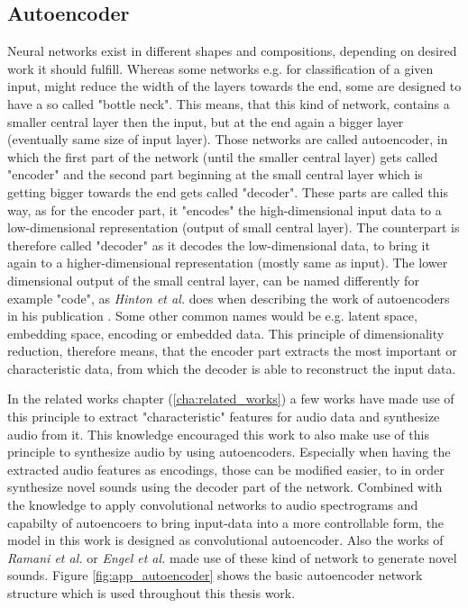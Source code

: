 \subsection{Autoencoder}
Neural networks exist in different shapes and compositions, depending on desired work it should fulfill. Whereas some networks e.g. for classification of a given input, might reduce the width of the layers towards the end, some are designed to have a so called "bottle neck". This means, that this kind of network, contains a smaller central layer then the input, but at the end again a bigger layer (eventually same size of input layer). \cite{hinton2006autoencoder} Those networks are called autoencoder, in which the first part of the network (until the smaller central layer) gets called "encoder" and the second part beginning at the small central layer which is getting bigger towards the end gets called "decoder". These parts are called this way, as for the encoder part, it "encodes" the high-dimensional input data to a low-dimensional representation (output of small central layer). The counterpart is therefore called "decoder" as it decodes the low-dimensional data, to bring it again to a higher-dimensional representation (mostly same as input). The lower dimensional output of the small central layer, can be named differently for example "code", as \textit{Hinton et al.} does when describing the work of autoencoders in his publication \cite{hinton2006autoencoder}. Some other common names would be e.g. latent space, embedding space, encoding or embedded data. This principle of dimensionality reduction, therefore means, that the encoder part extracts the most important or characteristic data, from which the decoder is able to reconstruct the input data.

In the related works chapter (\ref{cha:related_works}) a few works have made use of this principle to extract "characteristic" features for audio data and synthesize audio from it. This knowledge encouraged this work to also make use of this principle to synthesize audio by using autoencoders. Especially when having the extracted audio features as encodings, those can be modified easier, to in order synthesize novel sounds using the decoder part of the network. 
Combined with the knowledge to apply convolutional networks to audio spectrograms and capabilty of autoencoers to bring input-data into a more controllable form, the model in this work is designed as convolutional autoencoder. Also the works of \textit{Ramani et al.} or \textit{Engel et al.} made use of these kind of network to generate novel sounds. Figure \ref{fig:app_autoencoder} shows the basic autoencoder network structure which is used throughout this thesis work. 

